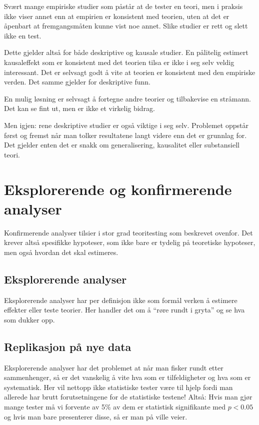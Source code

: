 \documentclass[
  letterpaper,
  DIV=11,
  numbers=noendperiod]{scrreprt}
\begin{document}
Svært mange empiriske studier som påstår at de tester en teori, men i
praksis ikke viser annet enn at empirien er konsistent med teorien, uten
at det er åpenbart at fremgangsmåten kunne vist noe annet. Slike studier
er rett og slett ikke en test.

Dette gjelder altså for både deskriptive og kausale studier. En
pålitelig estimert kausaleffekt som er konsistent med det teorien tilsa
er ikke i seg selv veldig interessant. Det er selvsagt godt å vite at
teorien er konsistent med den empiriske verden. Det samme gjelder for
deskriptive funn.

En mulig løsning er selvsagt å fortegne andre teorier og tilbakevise en
stråmann. Det kan se fint ut, men er ikke et virkelig bidrag.

Men igjen: rene deskriptive studier er også viktige i seg selv.
Problemet oppstår først og fremst når man tolker resultatene langt
videre enn det er grunnlag for. Det gjelder enten det er snakk om
generalisering, kausalitet eller substansiell teori.

\hypertarget{eksplorerende-og-konfirmerende-analyser}{%
\section{Eksplorerende og konfirmerende
analyser}\label{eksplorerende-og-konfirmerende-analyser}}

Konfirmerende analyser tilsier i stor grad teoritesting som beskrevet
ovenfor. Det krever altså spesifikke hypoteser, som ikke bare er tydelig
på teoretiske hypoteser, men også hvordan det skal estimeres.

\hypertarget{eksplorerende-analyser}{%
\subsection{Eksplorerende analyser}\label{eksplorerende-analyser}}

Eksplorerende analyser har per definisjon ikke som formål verken å
estimere effekter eller teste teorier. Her handler det om å ``røre rundt
i gryta'' og se hva som dukker opp.

\hypertarget{replikasjon-puxe5-nye-data}{%
\subsection{Replikasjon på nye data}\label{replikasjon-puxe5-nye-data}}

Eksplorerende analyser har det problemet at når man fisker rundt etter
sammenhenger, så er det vanskelig å vite hva som er tilfeldigheter og
hva som er systematisk. Her vil nettopp ikke statistiske tester være til
hjelp fordi man allerede har brutt forutsetningene for de statistiske
testene! Altså: Hvis man gjør mange tester må vi forvente av 5\% av dem
er statistisk signifikante med \(p < 0.05\) og hvis man bare presenterer
disse, så er man på ville veier.
\end{document}
